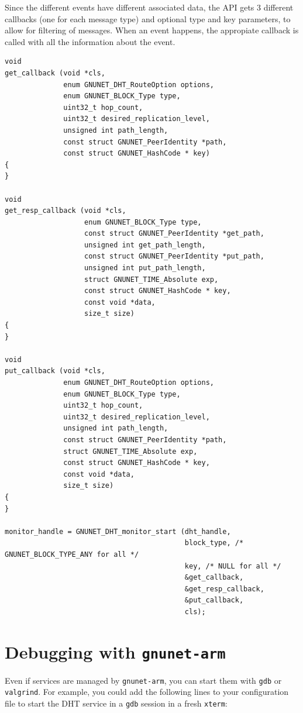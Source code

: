\documentclass[10pt]{article}
\begin{document}
Since the different events have different associated data, the API gets 3
different callbacks (one for each message type) and optional type and key parameters,
to allow for filtering of messages. When an event happens, the appropiate callback
is called with all the information about the event.
\lstset{language=C}
\begin{lstlisting}
void
get_callback (void *cls,
              enum GNUNET_DHT_RouteOption options,
              enum GNUNET_BLOCK_Type type,
              uint32_t hop_count,
              uint32_t desired_replication_level,
              unsigned int path_length,
              const struct GNUNET_PeerIdentity *path,
              const struct GNUNET_HashCode * key)
{
}

void
get_resp_callback (void *cls,
                   enum GNUNET_BLOCK_Type type,
                   const struct GNUNET_PeerIdentity *get_path,
                   unsigned int get_path_length,
                   const struct GNUNET_PeerIdentity *put_path,
                   unsigned int put_path_length,
                   struct GNUNET_TIME_Absolute exp,
                   const struct GNUNET_HashCode * key,
                   const void *data,
                   size_t size)
{
}

void
put_callback (void *cls,
              enum GNUNET_DHT_RouteOption options,
              enum GNUNET_BLOCK_Type type,
              uint32_t hop_count,
              uint32_t desired_replication_level,
              unsigned int path_length,
              const struct GNUNET_PeerIdentity *path,
              struct GNUNET_TIME_Absolute exp,
              const struct GNUNET_HashCode * key,
              const void *data,
              size_t size)
{
}

monitor_handle = GNUNET_DHT_monitor_start (dht_handle,
                                           block_type, /* GNUNET_BLOCK_TYPE_ANY for all */
                                           key, /* NULL for all */
                                           &get_callback,
                                           &get_resp_callback,
                                           &put_callback,
                                           cls);
\end{lstlisting}


\section{Debugging with {\tt gnunet-arm}}

Even if services are managed by {\tt gnunet-arm}, you can start them with
{\tt gdb} or {\tt valgrind}.  For example, you could add the following lines
to your configuration file to start the DHT service in a {\tt gdb} session in a
fresh {\tt xterm}:
\end{document}
